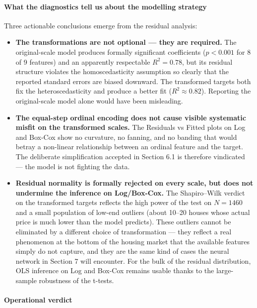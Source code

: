 \paragraph{What the diagnostics tell us about the modelling
strategy}\label{what-the-diagnostics-tell-us-about-the-modelling-strategy}

Three actionable conclusions emerge from the residual analysis:

\begin{itemize}
\tightlist
\item
  \textbf{The transformations are not optional --- they are required.}
  The original-scale model produces formally significant coefficients
  (\(p < 0.001\) for 8 of 9 features) and an apparently respectable
  \(R^2 = 0.78\), but its residual structure violates the
  homoscedasticity assumption so clearly that the reported standard
  errors are biased downward. The transformed targets both fix the
  heteroscedasticity and produce a better fit (\(R^2 \approx 0.82\)).
  Reporting the original-scale model alone would have been misleading.
\item
  \textbf{The equal-step ordinal encoding does not cause visible
  systematic misfit on the transformed scales.} The Residuals vs Fitted
  plots on Log and Box-Cox show no curvature, no fanning, and no banding
  that would betray a non-linear relationship between an ordinal feature
  and the target. The deliberate simplification accepted in Section 6.1
  is therefore vindicated --- the model is not fighting the data.
\item
  \textbf{Residual normality is formally rejected on every scale, but
  does not undermine the inference on Log/Box-Cox.} The Shapiro--Wilk
  verdict on the transformed targets reflects the high power of the test
  on \(N = 1460\) and a small population of low-end outliers (about
  10--20 houses whose actual price is much lower than the model
  predicts). These outliers cannot be eliminated by a different choice
  of transformation --- they reflect a real phenomenon at the bottom of
  the housing market that the available features simply do not capture,
  and they are the same kind of cases the neural network in Section 7
  will encounter. For the bulk of the residual distribution, OLS
  inference on Log and Box-Cox remains usable thanks to the large-sample
  robustness of the t-tests.
\end{itemize}

\paragraph{Operational verdict}\label{operational-verdict-2}

